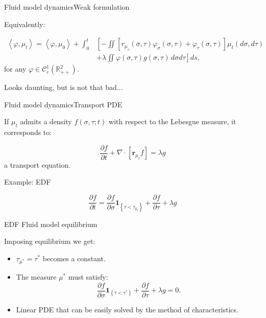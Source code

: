 \documentclass[aspectratio=169]{beamer}
\newcommand{\R}{\mathbb{R}}
\newcommand{\brackets}[2]{\left\langle#1,#2\right\rangle}
\newcommand{\ind}[1]{\mathbf{1}_{\left\{#1\right\}}}
\renewcommand{\phi}{\varphi}
\newenvironment*{myitem}[1][1.5em]{\begin{itemize}\setlength{\itemsep}{#1}}{\end{itemize}}
\begin{document}
\begin{frame}{Fluid model dynamics}{Weak formulation}

	Equivalently:

\begin{align*}
	\brackets{\phi}{\mu_t} = \brackets{\phi}{\mu_0} + \int_0^t &\left[- \iint \left[r_{\mu_s}(\sigma,\tau) \phi_\sigma (\sigma,\tau) + \phi_\tau(\sigma,\tau)\right]\mu_t(d\sigma,d\tau)\right.\\
	& \left. + \lambda \iint \phi(\sigma,\tau)g(\sigma,\tau)\, d\sigma d\tau \right]ds,
\end{align*}
for any $\phi \in \mathcal{C}^1_c(\R^2_{++})$.

\pause
\vfill

Looks daunting, but is not that bad...

\end{frame}

\begin{frame}{Fluid model dynamics}{Transport PDE}

	If $\mu_t$ admits a density $f(\sigma,\tau;t)$ with respect to the Lebesgue measure, it corresponds to:

	\begin{equation*}
		\frac{\partial f}{\partial t} + \nabla \cdot\left[\mathbf{r}_{\mu_t} f\right] = \lambda g
	\end{equation*}
	a transport equation.

	\pause

	\vfill

	\alert{Example: EDF}

	\begin{equation*}
		\frac{\partial f}{\partial t} = \frac{\partial f}{\partial \sigma}\ind{\tau<\tau_{\mu_t}} + \frac{\partial f}{\partial \tau} +\lambda g
	\end{equation*}

\end{frame}

\begin{frame}{EDF Fluid model equilibrium}

	Imposing equilibrium we get:

	\begin{myitem}
		\item $\tau_{\mu^*}=\tau^*$ becomes a constant.
		\item The measure $\mu^*$ must satisfy:
			 \begin{equation*}
				\frac{\partial f}{\partial \sigma}\ind{\tau<\tau^*}  + \frac{\partial f}{\partial \tau} +\lambda g = 0.
			\end{equation*}
		\item Linear PDE that can be easily solved by the method of characteristics.
	\end{myitem}


\end{frame}
\end{document}
